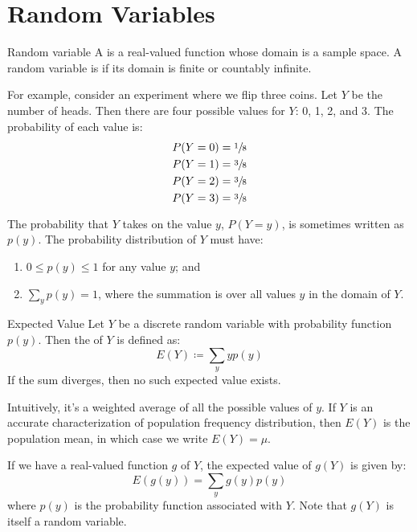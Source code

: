 \chapter{Random Variables}

\begin{dfnbox}{Random variable}{}
    A  is a real-valued function whose domain is a sample space. A random variable is  if its domain is finite or countably infinite.
\end{dfnbox}

For example, consider an experiment where we flip three coins. Let $Y$ be the number of heads. Then there are four possible values for $Y$: 0, 1, 2, and 3. The probability of each value is:
\begin{align*}
    P(Y = 0) &= \sfrac18 \\ 
    P(Y = 1) &= \sfrac38 \\
    P(Y = 2) &= \sfrac38 \\
    P(Y = 3) &= \sfrac38
\end{align*}


The probability that $Y$ takes on the value $y$, $P(Y = y)$, is sometimes written as $p(y)$. The probability distribution of $Y$ must have:
\begin{enumerate}
    \item $0 \leq p(y) \leq 1$ for any value $y$; and
    \item $\sum_y p(y) = 1$, where the summation is over all values $y$ in the domain of $Y$.
\end{enumerate}

\begin{dfnbox}{Expected Value}{}
    Let $Y$ be a discrete random variable with probability function $p(y)$. Then the  of $Y$ is defined as:
    \[ E(Y) \coloneq \sum_{y} yp(y) \]
    If the sum diverges, then no such expected value exists.
\end{dfnbox}

Intuitively, it's a weighted average of all the possible values of $y$. If $Y$ is an accurate characterization of population frequency distribution, then $E(Y)$ is the population mean, in which case we write $E(Y) = \mu$.

If we have a real-valued function $g$ of $Y$, the expected value of $g(Y)$ is given by:
\[ E\left( g(y) \right) = \sum_{y} g(y)p(y) \]
where $p(y)$ is the probability function associated with $Y$. Note that $g(Y)$ is itself a random variable.

